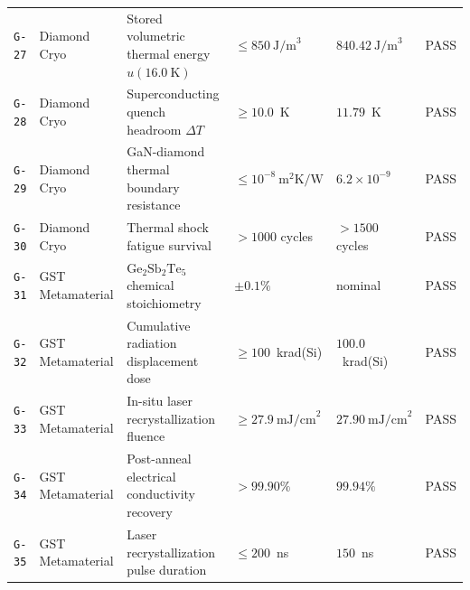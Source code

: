 \documentclass[11pt,onecolumn]{article}
\begin{document}
\begin{table}[!htbp]
\begin{tabularx}{\textwidth}{@{}l p{2.8cm} p{4.6cm} p{2.8cm} p{2.8cm} l@{}}
\texttt{G-27} & Diamond Cryo & Stored volumetric thermal energy $u(16.0~\text{K})$ & $\le 850~\text{J/m}^3$ & $840.42~\text{J/m}^3$ & PASS \\
\texttt{G-28} & Diamond Cryo & Superconducting quench headroom $\Delta T$ & $\ge 10.0$~K & $11.79$~K & PASS \\
\texttt{G-29} & Diamond Cryo & GaN-diamond thermal boundary resistance & $\le 10^{-8}~\text{m}^2\text{K/W}$ & $6.2\times 10^{-9}$ & PASS \\
\texttt{G-30} & Diamond Cryo & Thermal shock fatigue survival & $>1000$ cycles & $>1500$ cycles & PASS \\
\texttt{G-31} & GST Metamaterial & $\text{Ge}_2\text{Sb}_2\text{Te}_5$ chemical stoichiometry & $\pm 0.1\%$ & nominal & PASS \\
\texttt{G-32} & GST Metamaterial & Cumulative radiation displacement dose & $\ge 100$~krad(Si) & $100.0$~krad(Si) & PASS \\
\texttt{G-33} & GST Metamaterial & In-situ laser recrystallization fluence & $\ge 27.9~\text{mJ/cm}^2$ & $27.90~\text{mJ/cm}^2$ & PASS \\
\texttt{G-34} & GST Metamaterial & Post-anneal electrical conductivity recovery & $>99.90\%$ & $99.94\%$ & PASS \\
\texttt{G-35} & GST Metamaterial & Laser recrystallization pulse duration & $\le 200$~ns & $150$~ns & PASS \\
\bottomrule
\end{tabularx}
\end{table}
\end{document}
